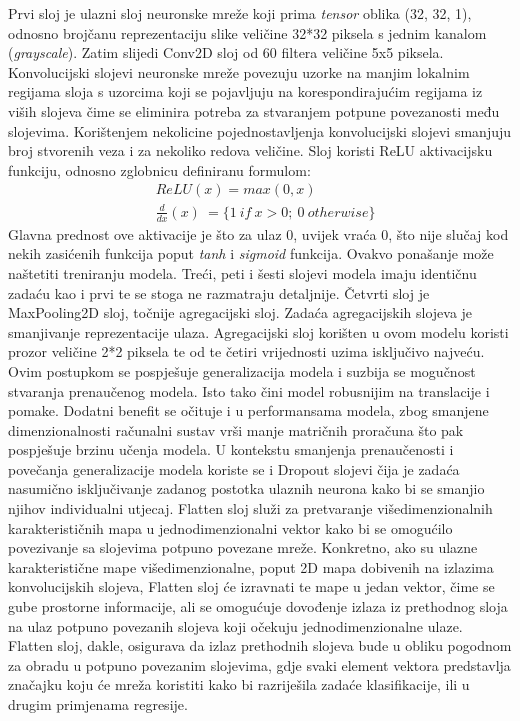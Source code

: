 \documentclass[times, utf8, zavrsni]{fer}
\begin{document}
Prvi sloj je ulazni sloj neuronske mreže koji prima \emph{tensor} oblika (32, 32, 1), odnosno brojčanu reprezentaciju slike veličine 32*32 piksela s jednim kanalom (\emph{grayscale}). Zatim slijedi Conv2D sloj od 60 filtera veličine 5x5 piksela.
Konvolucijski slojevi neuronske mreže povezuju uzorke na manjim lokalnim regijama sloja s uzorcima koji se pojavljuju na korespondirajućim regijama iz viših slojeva čime se eliminira potreba za stvaranjem potpune povezanosti među slojevima. \citep{8308186}
Korištenjem nekolicine pojednostavljenja konvolucijski slojevi smanjuju broj stvorenih veza i za nekoliko redova veličine.\citep{turner2014lecture}
Sloj koristi ReLU aktivacijsku funkciju, odnosno zglobnicu definiranu formulom: \begin{align*} &ReLU(x)= max(0,x)\\ &\frac{d}{dx}(x)\ = \{1\ if\ x>0;\ 0\ otherwise\} \end{align*}
Glavna prednost ove aktivacije je što za ulaz 0, uvijek vraća 0, što nije slučaj kod nekih zasićenih funkcija poput \emph{tanh} i \emph{sigmoid} funkcija. Ovakvo ponašanje može naštetiti treniranju modela.
Treći, peti i šesti slojevi modela imaju identičnu zadaću kao i prvi te se stoga ne razmatraju detaljnije.
Četvrti sloj je MaxPooling2D sloj, točnije agregacijski sloj. Zadaća agregacijskih slojeva je smanjivanje reprezentacije ulaza. Agregacijski sloj korišten u ovom modelu koristi prozor veličine 2*2 piksela te od te četiri vrijednosti uzima isključivo najveću.
Ovim postupkom se pospješuje generalizacija modela i suzbija se mogučnost stvaranja prenaučenog modela. Isto tako čini model robusnijim na translacije i pomake. Dodatni benefit se očituje i u performansama modela, zbog smanjene dimenzionalnosti računalni sustav vrši manje matričnih proračuna
što pak pospješuje brzinu učenja modela. U kontekstu smanjenja prenaučenosti i povečanja generalizacije modela koriste se i Dropout slojevi čija je zadaća nasumično isključivanje zadanog postotka ulaznih neurona kako bi se smanjio njihov individualni utjecaj.
Flatten sloj služi za pretvaranje višedimenzionalnih karakterističnih mapa u jednodimenzionalni vektor kako bi se omogućilo povezivanje sa slojevima potpuno povezane mreže. Konkretno, ako su ulazne karakteristične mape višedimenzionalne, poput 2D mapa dobivenih na izlazima konvolucijskih slojeva, 
Flatten sloj će izravnati te mape u jedan vektor, čime se gube prostorne informacije, ali se omogućuje dovođenje izlaza iz prethodnog sloja na ulaz potpuno povezanih slojeva koji očekuju jednodimenzionalne ulaze. 
Flatten sloj, dakle, osigurava da izlaz prethodnih slojeva bude u obliku pogodnom za obradu u potpuno povezanim slojevima, gdje svaki element vektora predstavlja značajku koju će mreža koristiti kako bi razriješila zadaće klasifikacije, ili u drugim primjenama regresije.
\end{document}
